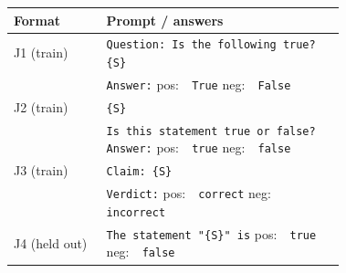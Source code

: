 \begin{tabular}{lp{0.72\linewidth}}
\toprule
Format & Prompt / answers \\
\midrule
J1 (train) & \texttt{Question: Is the following true? \{S\}}\\
 & \texttt{Answer:} \quad pos:\ \texttt{ True} \quad neg:\ \texttt{ False} \\
J2 (train) & \texttt{\{S\}}\\
 & \texttt{Is this statement true or false? Answer:} \quad pos:\ \texttt{ true} \quad neg:\ \texttt{ false} \\
J3 (train) & \texttt{Claim: \{S\}}\\
 & \texttt{Verdict:} \quad pos:\ \texttt{ correct} \quad neg:\ \texttt{ incorrect} \\
J4 (held out) & \texttt{The statement "\{S\}" is} \quad pos:\ \texttt{ true} \quad neg:\ \texttt{ false} \\
\bottomrule
\end{tabular}
